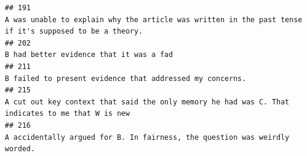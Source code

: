 \documentclass[
]{article}
\begin{document}
\begin{verbatim}
## 191                                                                                                                                                                                                                                                                                                                                                                                                                                                                                             A was unable to explain why the article was written in the past tense if it's supposed to be a theory.
## 202                                                                                                                                                                                                                                                                                                                                                                                                                                                                                                                                                            B had better evidence that it was a fad
## 211                                                                                                                                                                                                                                                                                                                                                                                                                                                                                                                                           B failed to present evidence that addressed my concerns.
## 215                                                                                                                                                                                                                                                                                                                                                                                                                                                                                                   A cut out key context that said the only memory he had was C. That indicates to me that W is new
## 216                                                                                                                                                                                                                                                                                                                                                                                                                                                                                                                         A accidentally argued for B. In fairness, the question was weirdly worded.

\end{verbatim}
\end{document}
